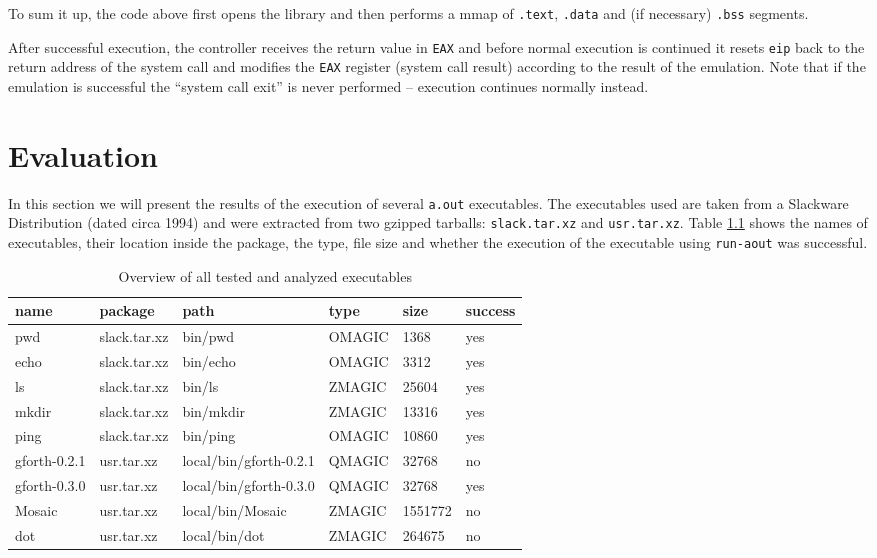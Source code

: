 \documentclass[draft,final]{vutinfth} %
\begin{document}
To sum it up, the code above first opens the library and then performs a mmap of \texttt{.text}, \texttt{.data} and (if necessary) \texttt{.bss} segments.

After successful execution, the controller receives the return value in \texttt{EAX} and before normal execution is continued it resets \texttt{eip} back to the return address of the system call and modifies the \texttt{EAX} register (system call result) according to the result of the emulation. Note that if the emulation is successful the ``system call exit'' is never performed -- execution continues normally instead.

\chapter{Evaluation}

In this section we will present the results of the execution of several \texttt{a.out} executables. The executables used are taken from a Slackware Distribution (dated circa 1994) and were extracted from two gzipped tarballs: \texttt{slack.tar.xz} and \texttt{usr.tar.xz}. Table \ref{tab:tested_executables} shows the names of executables, their location inside the package, the type, file size and whether the execution of the executable using \texttt{run-aout} was successful.

\begin{table}[H]
    \centering
    \begin{tabular}{|l|l|l|l|l|l|}\hline
    name & package & path & type & size & success   \\ \hline\hline
    pwd  & slack.tar.xz & bin/pwd & OMAGIC & 1368 & yes \\ \hline
    echo  & slack.tar.xz & bin/echo & OMAGIC & 3312 & yes \\ \hline
    ls  & slack.tar.xz & bin/ls & ZMAGIC & 25604 & yes \\ \hline
    mkdir  & slack.tar.xz & bin/mkdir & ZMAGIC & 13316 & yes \\ \hline
    ping  & slack.tar.xz & bin/ping & OMAGIC & 10860 & yes \\ \hline
    gforth-0.2.1  & usr.tar.xz & local/bin/gforth-0.2.1 & QMAGIC & 32768 & no \\ \hline
    gforth-0.3.0  & usr.tar.xz & local/bin/gforth-0.3.0 & QMAGIC & 32768 & yes \\ \hline
    Mosaic  & usr.tar.xz & local/bin/Mosaic & ZMAGIC & 1551772 & no \\ \hline
    dot  & usr.tar.xz & local/bin/dot & ZMAGIC & 264675 & no \\ \hline
    \end{tabular}
    \caption{Overview of all tested and analyzed executables}
    \label{tab:tested_executables}
\end{table}
\end{document}
